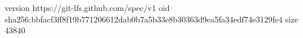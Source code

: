 version https://git-lfs.github.com/spec/v1
oid sha256:bbfacf3ff8f19b771206612dab0b7a5b33e8b30363d9ea5fa34edf74e3129fe4
size 43840
